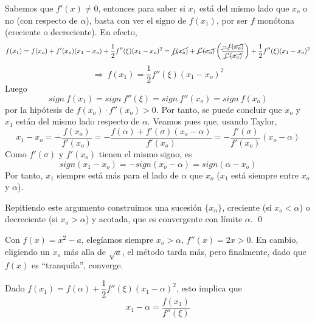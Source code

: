        \begin{dem}
            Sabemos que $f'(x)\neq 0$, entonces para saber si $x_1$ está del mismo lado que $x_o$ o no (con respecto de $\alpha$), basta con ver el signo de $f(x_1)$, por ser $f$ monótona (creciente o decreciente). En efecto, 
            $$f(x_1)=f(x_o)+f'(x_o)(x_1-x_o)+\dfrac{1}{2}f''(\xi)(x_1-x_o)^2=\cancel{f(x_o)}+\cancel{f'(x_o)}\left(\dfrac{\cancel{-f(x_o)}}{\cancel{f'(x_o)}} \right)+\dfrac{1}{2}f''(\xi)(x_1-x_o)^2$$
            $$\Rightarrow \: f(x_1)=\dfrac{1}{2}f''(\xi)(x_1-x_o)^2$$
            Luego 
            $$sign \: f(x_1)=sign \: f''(\xi)=sign \: f''(x_o)=sign \: f(x_o)$$
            por la hipótesis de $f(x_o) \cdot f''(x_o) > 0$. Por tanto, se puede concluir que $x_o$ y $x_1$ están del mismo lado respecto de $\alpha$. Veamos pues que, usando Taylor, 
            $$x_1-x_o=-\dfrac{f(x_o)}{f'(x_o)}=-\dfrac{f(\alpha)+f'(\sigma)(x_o-\alpha)}{f'(x_o)}=- \dfrac{f'(\sigma)}{f'(x_o)}(x_o-\alpha)$$
            Como $f'(\sigma)$ y $f'(x_o)$ tienen el mismo signo, es 
            $$sign (x_1-x_o)=-sign (x_o-\alpha)=sign (\alpha-x_o)$$
            Por tanto, $x_1$ siempre está más para el lado de $\alpha$ que $x_o$ ($x_1$ está siempre entre $x_o$ y $\alpha$).

            Repitiendo este argumento construimos una sucesión $\{x_n\}$, creciente (si $x_o<\alpha$) o decreciente (si $x_o > \alpha$) y acotada, que es convergente con límite $\alpha$. 
        \qed\end{dem}
    
    \begin{ejem}
        Con $f(x)=x^2-a$, elegíamos siempre $x_o > \alpha$, $f''(x)=2x>0$. En cambio, eligiendo un $x_o$ más alla de $\sqrt{a}$, el método tarda más, pero finalmente, dado que $f(x)$ es ``tranquila'', converge.

        Dado $f(x_1)=f(\alpha)+\dfrac{1}{2}f''(\xi)(x_1-\alpha)^2$, esto implica que $$x_1-\alpha=\dfrac{f(x_1)}{f''(\xi)}$$
    \end{ejem}

